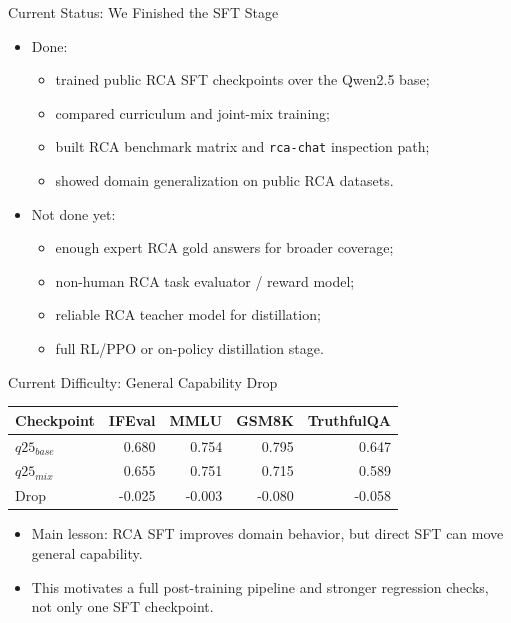 \begin{frame}{Current Status: We Finished the SFT Stage}
  \begin{itemize}
    \item Done:
      \begin{itemize}
        \item trained public RCA SFT checkpoints over the Qwen2.5 base;
        \item compared curriculum and joint-mix training;
        \item built RCA benchmark matrix and \texttt{rca-chat} inspection path;
        \item showed domain generalization on public RCA datasets.
      \end{itemize}
    \item Not done yet:
      \begin{itemize}
        \item enough expert RCA gold answers for broader coverage;
        \item non-human RCA task evaluator / reward model;
        \item reliable RCA teacher model for distillation;
        \item full RL/PPO or on-policy distillation stage.
      \end{itemize}
  \end{itemize}
\end{frame}

\begin{frame}{Current Difficulty: General Capability Drop}
  \scriptsize
  \begin{table}
    \begin{tabular}{lrrrr}
      \toprule
      Checkpoint & IFEval & MMLU & GSM8K & TruthfulQA \\
      \midrule
      $q25_{base}$ & 0.680 & 0.754 & 0.795 & 0.647 \\
      $q25_{mix}$ & 0.655 & 0.751 & 0.715 & 0.589 \\
      Drop & -0.025 & -0.003 & -0.080 & -0.058 \\
      \bottomrule
    \end{tabular}
  \end{table}
  \normalsize
  \begin{itemize}
    \item Main lesson: RCA SFT improves domain behavior, but direct SFT can move
      general capability.
    \item This motivates a full post-training pipeline and stronger regression
      checks, not only one SFT checkpoint.
  \end{itemize}
\end{frame}


